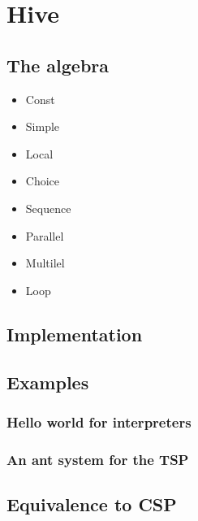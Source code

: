 \chapter{Hive}

\section{The algebra}
\begin{itemize}
  \item Const
  \item Simple
  \item Local
  \item Choice
  \item Sequence
  \item Parallel
  \item Multilel
  \item Loop
\end{itemize}

\section{Implementation}

\section{Examples}

\subsection{Hello world for interpreters}

\subsection{An ant system for the TSP}

\section{Equivalence to CSP}
